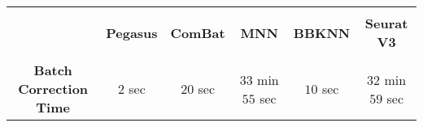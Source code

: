 \documentclass{article}
\begin{document}
\begin{center}
\begin{tabular}{|c|c|c|c|c|c|}\hline
& & & & & \\[-10pt]
 & \textbf{Pegasus} & \textbf{ComBat} & \textbf{MNN} & \textbf{BBKNN} & \textbf{Seurat V3}\\[2pt]\hline
 & & & & & \\[-10pt]
 \textbf{Batch Correction Time} & $2$ sec & $20$ sec & $33$ min $55$ sec & $10$ sec & $32$ min $59$ sec  \\[2pt]\hline
\end{tabular}
\end{center}
\end{document}
